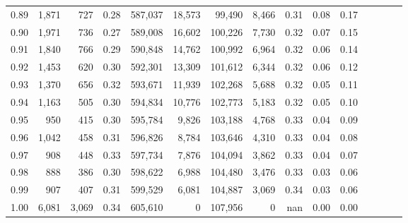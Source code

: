 \begin{tabular}{rrrcrrrrrrrrrrr}
0.89 &   1,871 &    727 &                                       0.28 &  587,037 &   18,573 &   99,490 &    8,466 &  0.31 &  0.08 &                         0.17 \\
0.90 &   1,971 &    736 &                                       0.27 &  589,008 &   16,602 &  100,226 &    7,730 &  0.32 &  0.07 &                         0.15 \\
0.91 &   1,840 &    766 &                                       0.29 &  590,848 &   14,762 &  100,992 &    6,964 &  0.32 &  0.06 &                         0.14 \\
0.92 &   1,453 &    620 &                                       0.30 &  592,301 &   13,309 &  101,612 &    6,344 &  0.32 &  0.06 &                         0.12 \\
0.93 &   1,370 &    656 &                                       0.32 &  593,671 &   11,939 &  102,268 &    5,688 &  0.32 &  0.05 &                         0.11 \\
0.94 &   1,163 &    505 &                                       0.30 &  594,834 &   10,776 &  102,773 &    5,183 &  0.32 &  0.05 &                         0.10 \\
0.95 &     950 &    415 &                                       0.30 &  595,784 &    9,826 &  103,188 &    4,768 &  0.33 &  0.04 &                         0.09 \\
0.96 &   1,042 &    458 &                                       0.31 &  596,826 &    8,784 &  103,646 &    4,310 &  0.33 &  0.04 &                         0.08 \\
0.97 &     908 &    448 &                                       0.33 &  597,734 &    7,876 &  104,094 &    3,862 &  0.33 &  0.04 &                         0.07 \\
0.98 &     888 &    386 &                                       0.30 &  598,622 &    6,988 &  104,480 &    3,476 &  0.33 &  0.03 &                         0.06 \\
0.99 &     907 &    407 &                                       0.31 &  599,529 &    6,081 &  104,887 &    3,069 &  0.34 &  0.03 &                         0.06 \\
1.00 &   6,081 &  3,069 &                                       0.34 &  605,610 &        0 &  107,956 &        0 &   nan &  0.00 &                         0.00 \\
\bottomrule
\end{tabular}
